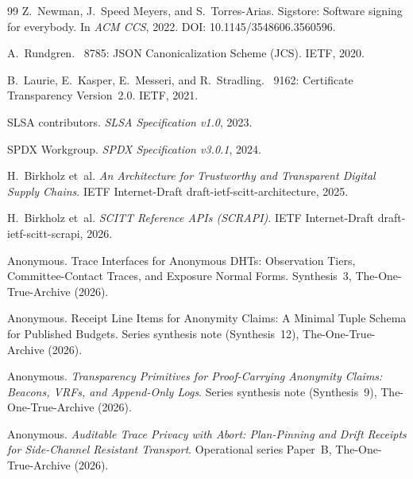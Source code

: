 \documentclass[11pt]{article}
\begin{document}
\begin{thebibliography}{99}
Z.~Newman, J.~Speed Meyers, and S.~Torres-Arias.
\newblock Sigstore: Software signing for everybody.
\newblock In \emph{ACM CCS}, 2022. DOI: 10.1145/3548606.3560596.

A.~Rundgren.
~8785: {JSON} Canonicalization Scheme ({JCS}).
\newblock IETF, 2020.

B.~Laurie, E.~Kasper, E.~Messeri, and R.~Stradling.
~9162: Certificate Transparency Version~2.0.
\newblock IETF, 2021.

SLSA contributors.
\newblock \emph{SLSA Specification v1.0}, 2023.

SPDX Workgroup.
\newblock \emph{SPDX Specification v3.0.1}, 2024.

H.~Birkholz et~al.
\newblock \emph{An Architecture for Trustworthy and Transparent Digital Supply Chains}.
\newblock IETF Internet-Draft draft-ietf-scitt-architecture, 2025.

H.~Birkholz et~al.
\newblock \emph{SCITT Reference APIs (SCRAPI)}.
\newblock IETF Internet-Draft draft-ietf-scitt-scrapi, 2026.

Anonymous.
\newblock Trace Interfaces for Anonymous DHTs: Observation Tiers, Committee-Contact Traces, and Exposure Normal Forms.
\newblock Synthesis~3, The-One-True-Archive (2026).

Anonymous.
\newblock Receipt Line Items for Anonymity Claims: A Minimal Tuple Schema for Published Budgets.
\newblock Series synthesis note (Synthesis~12), The-One-True-Archive (2026).

Anonymous.
\newblock \emph{Transparency Primitives for Proof-Carrying Anonymity Claims: Beacons, VRFs, and Append-Only Logs}.
\newblock Series synthesis note (Synthesis~9), The-One-True-Archive (2026).


Anonymous.
\newblock \emph{Auditable Trace Privacy with Abort: Plan-Pinning and Drift Receipts for Side-Channel Resistant Transport}.
\newblock Operational series Paper~B, The-One-True-Archive (2026).

\end{thebibliography}
\end{document}
